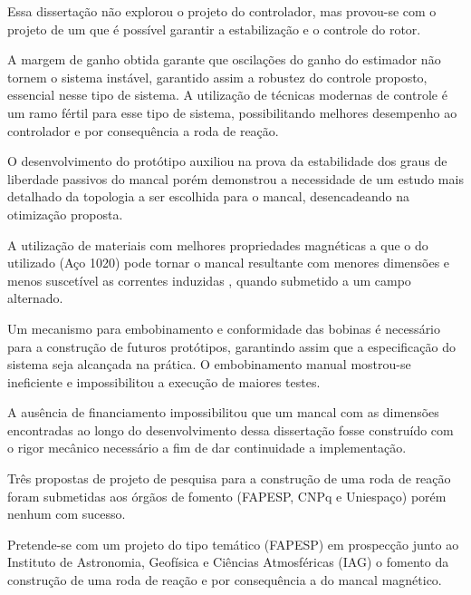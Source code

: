 Essa dissertação não explorou o projeto do controlador, mas provou-se com o projeto de um que é possível garantir a estabilização e o controle do rotor.

A margem de ganho obtida garante que oscilações do ganho do estimador não tornem o sistema instável, garantido assim a robustez do controle proposto, essencial nesse tipo de sistema. A utilização de técnicas modernas de controle é um ramo fértil para esse tipo de sistema, possibilitando melhores desempenho ao controlador e por consequência a roda de reação. 

O desenvolvimento do protótipo auxiliou na prova da estabilidade dos graus de liberdade passivos do mancal porém demonstrou a necessidade de um estudo mais detalhado da topologia a ser escolhida para o mancal, desencadeando na otimização proposta.

A utilização de materiais com melhores propriedades magnéticas a que o do utilizado (Aço 1020) pode tornar o mancal resultante com menores dimensões e menos suscetível as correntes induzidas \citep{Ravaud2009}, quando submetido a um campo alternado.

Um mecanismo para embobinamento e conformidade das bobinas é necessário para a construção de futuros protótipos, garantindo assim que a especificação do sistema seja alcançada na prática. O embobinamento manual mostrou-se ineficiente e impossibilitou a execução de maiores testes.

A ausência de financiamento impossibilitou que um mancal com as dimensões encontradas ao longo do desenvolvimento dessa dissertação fosse construído com o rigor mecânico necessário a fim de dar continuidade a implementação.

Três propostas de projeto de pesquisa para a construção de uma roda de reação foram submetidas aos órgãos de fomento (FAPESP, CNPq e Uniespaço) porém nenhum com sucesso. 

Pretende-se com um projeto do tipo temático (FAPESP) em prospecção junto ao Instituto de Astronomia, Geofísica e Ciências Atmosféricas (IAG) o fomento da construção de uma roda de reação e por consequência a do mancal magnético.

